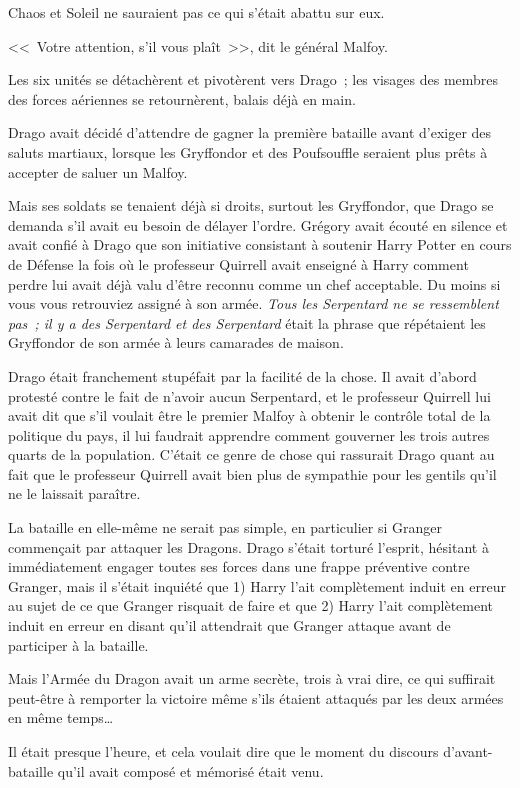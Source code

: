 Chaos et Soleil ne sauraient pas ce qui s'était abattu sur eux.

<<~Votre attention, s'il vous plaît~>>, dit le général Malfoy.

Les six unités se détachèrent et pivotèrent vers Drago~; les visages des membres des forces aériennes se retournèrent, balais déjà en main.

Drago avait décidé d'attendre de gagner la première bataille avant d'exiger des saluts martiaux, lorsque les Gryffondor et des Poufsouffle seraient plus prêts à accepter de saluer un Malfoy.

Mais ses soldats se tenaient déjà si droits, surtout les Gryffondor, que Drago se demanda s'il avait eu besoin de délayer l'ordre. Grégory avait écouté en silence et avait confié à Drago que son initiative consistant à soutenir Harry Potter en cours de Défense la fois où le professeur Quirrell avait enseigné à Harry comment perdre lui avait déjà valu d'être reconnu comme un chef acceptable. Du moins si vous vous retrouviez assigné à son armée. \emph{Tous les Serpentard ne se ressemblent pas~; il y a des Serpentard et des Serpentard} était la phrase que répétaient les Gryffondor de son armée à leurs camarades de maison.

Drago était franchement stupéfait par la facilité de la chose. Il avait d'abord protesté contre le fait de n'avoir aucun Serpentard, et le professeur Quirrell lui avait dit que s'il voulait être le premier Malfoy à obtenir le contrôle total de la politique du pays, il lui faudrait apprendre comment gouverner les trois autres quarts de la population. C'était ce genre de chose qui rassurait Drago quant au fait que le professeur Quirrell avait bien plus de sympathie pour les gentils qu'il ne le laissait paraître.

La bataille en elle-même ne serait pas simple, en particulier si Granger commençait par attaquer les Dragons. Drago s'était torturé l'esprit, hésitant à immédiatement engager toutes ses forces dans une frappe préventive contre Granger, mais il s'était inquiété que 1) Harry l'ait complètement induit en erreur au sujet de ce que Granger risquait de faire et que 2) Harry l'ait complètement induit en erreur en disant qu'il attendrait que Granger attaque avant de participer à la bataille.

Mais l'Armée du Dragon avait un arme secrète, trois à vrai dire, ce qui suffirait peut-être à remporter la victoire même s'ils étaient attaqués par les deux armées en même temps…

Il était presque l'heure, et cela voulait dire que le moment du discours d'avant-bataille qu'il avait composé et mémorisé était venu.

